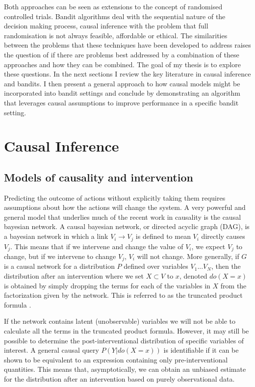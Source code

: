 \documentclass[11pt,a4paper]{article}
\begin{document}
Both approaches can be seen as extensions to the concept of randomised controlled trials. Bandit algorithms deal with the sequential nature of the decision making process, causal inference with the problem that full randomisation is not always feasible, affordable or ethical. The similarities between the problems that these techniques have been developed to address raises the question of if there are problems best addressed by a combination of these approaches and how they can be combined. The goal of my thesis is to explore these questions. In the next sections I review the key literature in causal inference and bandits. I then present a general approach to  how causal models might be incorporated into bandit settings and conclude by demonstrating an algorithm that leverages causal assumptions to improve performance in a specific bandit setting. 

\section{Causal Inference}

\subsection{Models of causality and intervention}

Predicting the outcome of actions without explicitly taking them requires assumptions about how the actions will change the system. A very powerful and general model that underlies much of the recent work in causality is the causal bayesian network. A causal bayesian network, or directed acyclic graph (DAG), is a bayesian network in which a link $V_{i} \rightarrow V_{j}$ is defined to mean $V_{i}$ directly causes $V_{j}$. This means that if we intervene and change the value of $V_{i}$, we expect $V_{j}$ to change, but if we intervene to change $V_{j}$, $V_{i}$ will not change. More generally, if $G$ is a causal network for a distribution $P$ defined over variables $V_{1}...V_{N}$, then the distribution after an intervention where we set $X \subset V$ to $x$, denoted $do(X=x)$ is obtained by simply dropping the terms for each of the variables in $X$ from the factorization given by the network. This is referred to as the truncated product formula \cite{Pearl2000}. 

If the network contains latent (unobservable) variables we will not be able to calculate all the terms in the truncated product formula. However, it may still be possible to determine the post-interventional distribution of specific variables of interest. A general causal query $P(Y|do(X=x))$ is identifiable if it can be shown to be equivalent to an expression containing only pre-interventional quantities. This means that, asymptotically, we can obtain an unbiased estimate for the distribution after an intervention based on purely observational data. 
\end{document}
